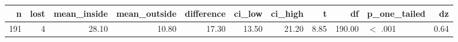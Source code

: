 \begin{tabular}{rrrrrrrrrlr}
  \toprule
n & lost & mean\_inside & mean\_outside & difference & ci\_low & ci\_high & t & df & p\_one\_tailed & dz \\ 
  \midrule
191 &   4 & 28.10 & 10.80 & 17.30 & 13.50 & 21.20 & 8.85 & 190.00 & $<$ .001 & 0.64 \\ 
   \bottomrule
\end{tabular}
